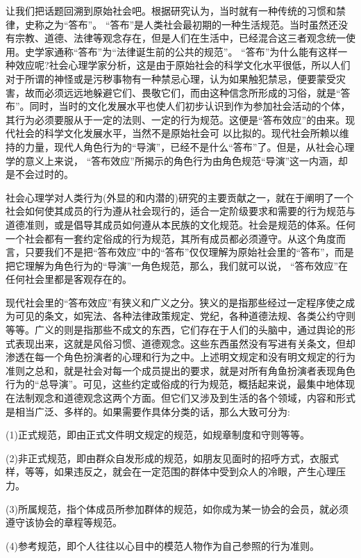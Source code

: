 \documentclass[11pt]{ctexart}
\begin{document}
让我们把话题回溯到原始社会吧。根据研究认为，当时就有一种传统的习惯和禁律，史称之为“答布”。 “答布''是人类社会最初期的一种生活规范。当时虽然还没有宗教、道德、法律等观念存在，但是人们在生活中，已经混合这三者观念统一使用。史学家通称“答布”为“法律诞生前的公共的规范”。 “答布”为什么能有这样一种效应呢?社会心理学家分析，这是由于原始社会的科学文化水平很低，所以人们对于所谓的神怪或是污秽事物有一种禁忌心理，认为如果触犯禁忌，便要蒙受灾害，故而必须远远地躲避它们、畏敬它们，而由这种信念所形成的习俗，就是“答布”。同时，当时的文化发展水平也使人们初步认识到作为参加社会活动的个体，其行为必须要服从于一定的法则、一定的行为规范。这便是“答布效应”的由来。现代社会的科学文化发展水平，当然不是原始社会可
以比拟的。现代社会所赖以维持的力量，现代人角色行为的“导演”，已经不是什么“答布”了。但是，从社会心理学的意义上来说， “答布效应”所揭示的角色行为由角色规范“导演”这一内涵，却是不会过时的。

社会心理学对人类行为(外显的和内潜的)研究的主要贡献之一，就在于阐明了一个社会如何使其成员的行为遵从社会现行的，适合一定阶级要求和需要的行为规范与道德准则，或是倡导其成员如何遵从本民族的文化规范。社会是规范的体系。任何一个社会都有一套约定俗成的行为规范，其所有成员都必须遵守。从这个角度而言，只要我们不是把“答布效应”中的“答布”仅仅理解为原始社会里的“答布”，而是把它理解为角色行为的“导演”一角色规范，那么，我们就可以说， “答布效应”在任何社会里都是客观存在的。

现代社会里的“答布效应”有狭义和广义之分。狭义的是指那些经过一定程序使之成为可见的条文，如宪法、各种法律政策规定、党纪，各种道德法规、各类公约守则等等。广义的则是指那些不成文的东西，它们存在于人们的头脑中，通过舆论的形式表现出来，这就是风俗习惯、道德观念。这些东西虽然没有写进有关条文，但却渗透在每一个角色扮演者的心理和行为之中。上述明文规定和没有明文规定的行为准则之总和，就是社会对每一个成员提出的要求，就是对所有角鱼扮演者表现角色行为的“总导演”。可见，这些约定或俗成的行为规范，概括起来说，最集中地体现在法制观念和道德观念这两个方面。但它们又涉及到生活的各个领域，内容和形式是相当广泛、多样的。如果需要作具体分类的话，那么大致可分为:

(1)正式规范，即由正式文件明文规定的规范，如规章制度和守则等等。

(2)非正式规范，即由群众自发形成的规范，如朋友见面时的招呼方式，衣服式样，等等，如果违反之，就会在一定范围的群体中受到众人的冷眼，产生心理压力。

(3)所属规范，指个体成员所参加群体的规范，如你成为某一协会的会员，就必须遵守该协会的章程等规范。

(4)参考规范，即个人往往以心目中的模范人物作为自己参照的行为准则。
\end{document}
